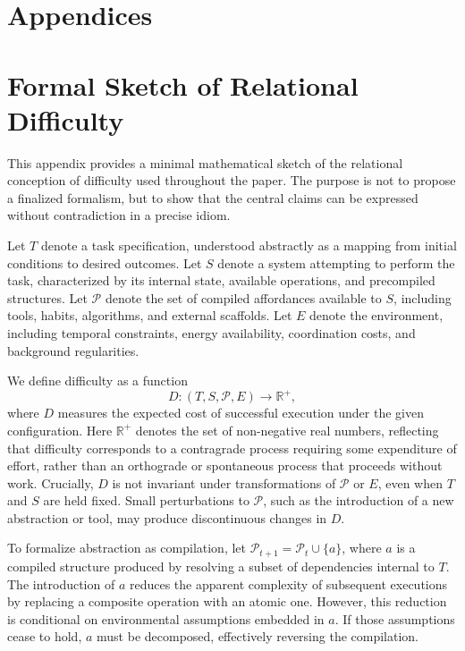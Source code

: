 \documentclass[12pt]{article}
\begin{document}
\newpage
\section*{Appendices}

\appendix

\section{Formal Sketch of Relational Difficulty}

This appendix provides a minimal mathematical sketch of the relational conception of difficulty used throughout the paper. The purpose is not to propose a finalized formalism, but to show that the central claims can be expressed without contradiction in a precise idiom.

Let $T$ denote a task specification, understood abstractly as a mapping from initial conditions to desired outcomes. Let $S$ denote a system attempting to perform the task, characterized by its internal state, available operations, and precompiled structures. Let $\mathcal{P}$ denote the set of compiled affordances available to $S$, including tools, habits, algorithms, and external scaffolds. Let $E$ denote the environment, including temporal constraints, energy availability, coordination costs, and background regularities.

We define difficulty as a function
\[
D : (T, S, \mathcal{P}, E) \longrightarrow \mathbb{R}^+,
\]
where $D$ measures the expected cost of successful execution under the given configuration. Here $\mathbb{R}^+$ denotes the set of non-negative real numbers, reflecting that difficulty corresponds to a contragrade process requiring some expenditure of effort, rather than an orthograde or spontaneous process that proceeds without work. Crucially, $D$ is not invariant under transformations of $\mathcal{P}$ or $E$, even when $T$ and $S$ are held fixed. Small perturbations to $\mathcal{P}$, such as the introduction of a new abstraction or tool, may produce discontinuous changes in $D$.

To formalize abstraction as compilation, let $\mathcal{P}_{t+1} = \mathcal{P}_t \cup \{a\}$, where $a$ is a compiled structure produced by resolving a subset of dependencies internal to $T$. The introduction of $a$ reduces the apparent complexity of subsequent executions by replacing a composite operation with an atomic one. However, this reduction is conditional on environmental assumptions embedded in $a$. If those assumptions cease to hold, $a$ must be decomposed, effectively reversing the compilation.
\end{document}
